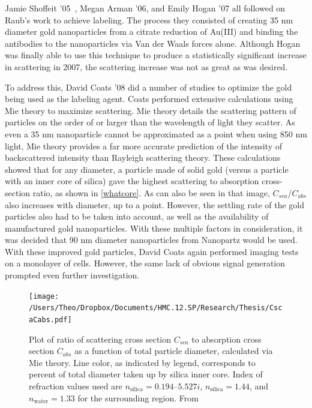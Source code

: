 Jamie Shoffeit '05~\citep{chanshoffeit}, Megan Arman '06, and Emily Hogan '07 all followed on Raub's work to achieve labeling. The process they consisted of creating 35 nm diameter gold nanoparticles from a citrate reduction of Au(III) and binding the antibodies to the nanoparticles via Van der Waals forces alone. Although Hogan was finally able to use this technique to produce a statistically significant increase in scattering in 2007, the scattering increase was not as great as was desired.

To address this, David Coats '08 did a number of studies to optimize the gold being used as the labeling agent. Coats performed extensive calculations using Mie theory to maximize scattering. Mie theory details the scattering pattern of particles on the order of or larger than the wavelength of light they scatter. As even a 35 nm nanoparticle cannot be approximated as a point when using 850 nm light, Mie theory provides a far more accurate prediction of the intensity of backscattered intensity than Rayleigh scattering theory. These calculations showed that for any diameter, a particle made of solid gold (versus a particle with an inner core of silica) gave the highest scattering to absorption cross-section ratio, as shown in \autoref{whatcore}. As can also be seen in that image, $C_{sca}/C_{abs}$ also increases with diameter, up to a point. However, the settling rate of the gold particles also had to be taken into account, as well as the availability of manufactured gold nanoparticles. With these multiple factors in consideration, it was decided that 90 nm diameter nanoparticles from Nanopartz would be used. With these improved gold particles, David Coats again performed imaging tests on a monolayer of cells. However, the same lack of obvious signal generation prompted even further investigation.

\begin{figure}[htbp]
\centering
\texttt{[image: /Users/Theo/Dropbox/Documents/HMC.12.SP/Research/Thesis/CscaCabs.pdf]}
\caption{Plot of ratio of scattering cross section $C_{sca}$ to absorption cross section $C_{abs}$ as a function of total particle diameter, calculated via Mie theory. Line color, as indicated by legend, corresponds to percent of total diameter taken up by silica inner core. Index of refraction values used are $n_{\mathrm{silica}}=0.194 – 5.527i$, $n_{\mathrm{silica}}=1.44$, and $n_{\mathrm{water}}=1.33$ for the surrounding region. From ~\citep{coats}}
\label{whatcore}
\end{figure}



